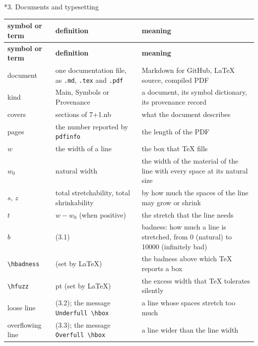 \documentclass[10pt,a4paper]{article}
\makeatletter
\renewcommand\section{\@startsection{section}{1}{\z@}{-3.5ex \@plus -1ex \@minus -.2ex}{2.3ex \@plus.2ex}{\normalfont\Large\bfseries\raggedright}}
\makeatother
\begin{document}
\section*{3. Documents and typesetting}
{\footnotesize
\begin{longtable}{>{\raggedright\arraybackslash}p{}>{\raggedright\arraybackslash}p{}>{\raggedright\arraybackslash}p{}}
\toprule
\textbf{symbol or term} & \textbf{definition} & \textbf{meaning} \\
\midrule\endfirsthead
\toprule
\textbf{symbol or term} & \textbf{definition} & \textbf{meaning} \\
\midrule\endhead
\endfoot
\bottomrule\endlastfoot
document & one documentation file, as \texttt{.md}, \texttt{.tex} and \texttt{.pdf} & Markdown for GitHub, LaTeX source, compiled PDF \\
kind & Main, Symbols or Provenance & a document, its symbol dictionary, its provenance record \\
covers & sections of 7+1.nb & what the document describes \\
pages & the number reported by \texttt{pdfinfo} & the length of the PDF \\
$w$ & the width of a line & the box that TeX fills \\
$w_0$ & natural width & the width of the material of the line with every space at its natural size \\
$s$, $z$ & total stretchability, total shrinkability & by how much the spaces of the line may grow or shrink \\
$t$ & $w-w_0$ (when positive) & the stretch that the line needs \\
$b$ & (3.1) & badness: how much a line is stretched, from 0 (natural) to 10000 (infinitely bad) \\
\texttt{\textbackslash{}\allowbreak{}hbadness} & 1000 (set by LaTeX) & the badness above which TeX reports a box \\
\texttt{\textbackslash{}\allowbreak{}hfuzz} & 0.1 pt (set by LaTeX) & the excess width that TeX tolerates silently \\
loose line & (3.2); the message \texttt{Underfull \textbackslash{}\allowbreak{}hbox} & a line whose spaces stretch too much \\
overflowing line & (3.3); the message \texttt{Overfull \textbackslash{}\allowbreak{}hbox} & a line wider than the line width \\

\end{longtable}}
\end{document}
